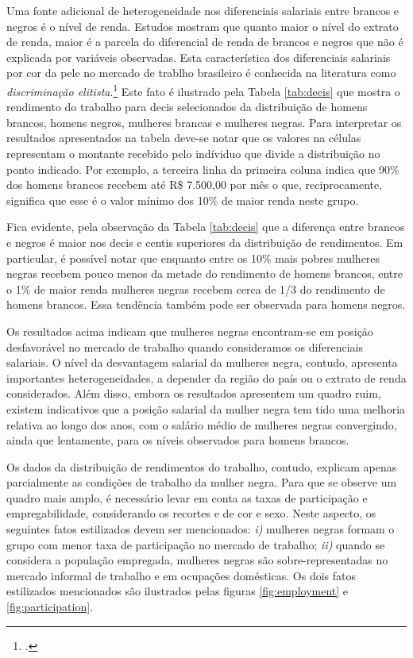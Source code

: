 \documentclass[12pt]{article}
\begin{document}
\par Uma fonte adicional de heterogeneidade nos diferenciais salariais entre brancos e negros é o nível de renda. Estudos mostram que quanto maior o nível do extrato de renda, maior é a parcela do diferencial de renda de brancos e negros que não é explicada por variáveis observadas. Esta característica dos diferenciais salariais por cor da pele no mercado de trablho brasileiro é conhecida na literatura como \textit{discriminação elitista}.\footcite{soares2000perfil,campante2004desigualdade} Este fato é ilustrado pela Tabela \ref{tab:decis} que mostra o rendimento do trabalho para decis selecionados da distribuição de homens brancos, homens negros, mulheres brancas e mulheres negras. Para interpretar os resultados apresentados na tabela deve-se notar que os valores na células representam o montante recebido pelo indíviduo que divide a distribuição no ponto indicado. Por exemplo, a terceira linha da primeira coluna indica que 90\% dos homens brancos recebem até R\$ 7.500,00 por mês o que, reciprocamente, significa que esse é o valor mínimo dos 10\% de maior renda neste grupo.



\par Fica evidente, pela observação da Tabela \ref{tab:decis} que a diferença entre brancos e negros é maior nos decis e centis superiores da distribuição de rendimentos. Em particular, é possível notar que enquanto entre os 10\% mais pobres mulheres negras recebem pouco menos da metade do rendimento de homens brancos, entre o 1\% de maior renda mulheres negras recebem cerca de 1/3 do rendimento de homens brancos. Essa tendência também pode ser observada para homens negros.

\par Os resultados acima indicam que mulheres negras encontram-se em posição desfavorável no mercado de trabalho quando consideramos os diferenciais salariais. O nível da desvantagem salarial da mulheres negra, contudo, apresenta importantes heterogeneidades, a depender da região do país ou o extrato de renda considerados. Além disso, embora os resultados apresentem um quadro ruim, existem indicativos que a posição salarial da mulher negra tem tido uma melhoria relativa ao longo dos anos, com o salário médio de mulheres negras convergindo, ainda que lentamente, para os níveis observados para homens brancos. 

\par Os dados da distribuição de rendimentos do trabalho, contudo, explicam apenas parcialmente as condições de trabalho da mulher negra. Para que se observe um quadro mais amplo, é necessário levar em conta as taxas de participação e empregabilidade, considerando os recortes e de cor e sexo. Neste aspecto, os seguintes fatos estilizados devem ser mencionados: \textit{i)} mulheres negras formam o grupo com menor taxa de participação no mercado de trabalho; \textit{ii)} quando se considera a população empregada, mulheres negras são sobre-representadas no mercado informal de trabalho e em ocupações domésticas. Os dois fatos estilizados mencionados são ilustrados pelas figuras \ref{fig:employment} e \ref{fig:participation}.
\end{document}
